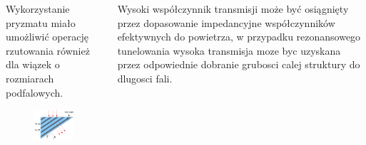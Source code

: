 \documentclass{beamer}
\begin{document}
\begin{frame}
\begin{columns}
\begin{column}{0.5\textwidth}
\begin{figure}
			\end{figure}
		\end{column}
	\end{columns}
	\cite{PhysRevLett.85.3966}		
\end{frame}


\begin{frame}
	\begin{columns}
		\begin{column}{0.5\textwidth}
			Wykorzystanie pryzmatu miało umożliwić operację rzutowania również dla wiązek o rozmiarach podfalowych.
			\begin{figure}
				\includegraphics[width=\textwidth]{../images/multilayer/prism.png}
			\end{figure}
		\end{column}
		\begin{column}{0.5\textwidth}
			Wysoki współczynnik transmisji może być osiągnięty przez dopasowanie impedancyjne współczynników efektywnych do powietrza, w przypadku rezonansowego tunelowania wysoka transmisja moze byc uzyskana przez odpowiednie dobranie grubosci calej struktury do dlugosci fali.

		\end{column}
	\end{columns}
			\cite{scalora2001transparent}
		
\end{frame}
\end{document}
